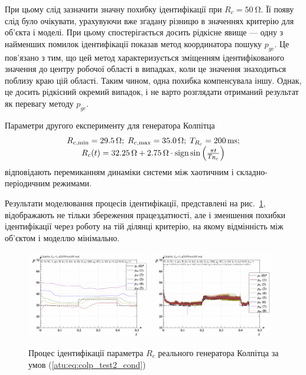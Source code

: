 При цьому слід зазначити значну похибку ідентифікації при
$ R_c = \SI{50}{\ohm} $. Її появу слід було очікувати, урахувуючи вже
згадану різницю в значеннях критерію для об'єкта і моделі. При
цьому спостерігається досить рідкісне явище --- одну з найменших
помилок ідентифікації показав метод координатора пошуку
$ p_{gc} $. Це пов'язано з тим, що цей метод характеризується
зміщенням ідентифікованого значення до центру робочої області в
випадках, коли це значення знаходиться
поблизу краю цій області. Таким чином, одна похибка компенсувала
іншу. Однак, це досить рідкісний окремий випадок, і не варто
розглядати отриманий результат як перевагу методу
$p_{gc}$.


Параметри другого експерименту для генератора Колпітца
%
\begin{equation}
  \begin{array}{c}
    R_{c,\min} = \SI{29.5}{\ohm};
    \;
    R_{c,\max} = \SI{35.0}{\ohm};
    \;
    T_{R_c} = \SI{200}{\milli\second};
  \\
    R_c(t) = \SI{32.25}{\ohm} + \SI{2.75}{\ohm} \cdot \operatorname*{sign} \sin \left( \frac{\pi t}{T_{R_c}}  \right)
  \end{array}
  \label{atu:eq:colp_test2_cond}
\end{equation}
%
відповідають перемиканням динаміки системи між хаотичним і
складно-періодичним режимами.

Результати моделювання процесів ідентифікації, представлені
на рис.~\ref{atu:f:colp_r_id_2}, відображають не тільки збереження
працездатності, але і зменшення похибки ідентифікації через
роботу на тій ділянці критерію, на якому відмінність між об'єктом
і моделлю мінімально.

\begin{figure}[htb!]
  \centerline{
    \includegraphics[width=0.48\textwidth]{p/r/colp_real_id-p_t_pi_ql3rlWvnAAW_real_d_1.png}
    \hfill
    \includegraphics[width=0.48\textwidth]{p/r/colp_real_id-p_t_p_ql3rlWvnAAW_real_d_1.png}
  }
\caption{Процес ідентифікації параметра $ R_c $ реального генератора Колпітца за умов (\ref{atu:eq:colp_test2_cond})}
\label{atu:f:colp_r_id_2}
\end{figure}


